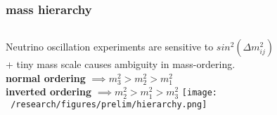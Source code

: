 \documentclass{beamer}
\begin{document}
	\begin{frame}
		\frametitle{mass hierarchy}
		\begin{columns}[c] %
			
			Neutrino oscillation experiments are sensitive to $sin^2\left(\Delta m_{ij}^2\right)$
			\\ + tiny mass scale causes ambiguity in mass-ordering. \\
			\medskip
			\textbf{normal ordering} $\implies m_3^2 > m_2^2 > m_1^2$ \\
			\textbf{inverted ordering} $\implies m_2^2 > m_1^2 > m_3^2$
			\texttt{[image: ~/research/figures/prelim/hierarchy.png]}

			
		\end{columns}
	\end{frame}
	
	
		
	
%			
%			
	
\end{document}
